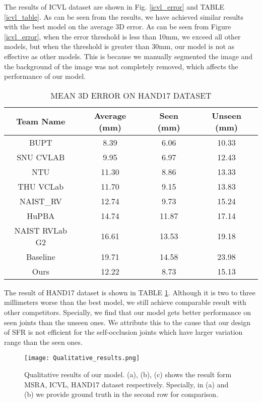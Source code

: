 \documentclass[journal]{IEEEtran}
\begin{document}
The results of ICVL dataset are shown in Fig\@. \ref{icvl_error} and TABLE \ref{icvl_table}.  
As can be seen from the results, we have achieved similar results with the best model\cite{chang2018v2v} on the average 3D error. 
As can be seen from Figure \ref{icvl_error}, when the error threshold is less than 10mm, we exceed all other models, 
but when the threshold is greater than 30mm, our model is not as effective as other models. 
This is because we manually segmented the image and the background of the image was not completely removed, 
which affects the performance of our model.

\begin{table}[!t]
\renewcommand{\arraystretch}{1.3}
  \caption{MEAN 3D ERROR ON HAND17 DATASET}
  \label{Hand17_table}
  \centering
    \begin{tabular}{c c c c}
    \toprule
    Team Name & Average (mm) & Seen (mm) & Unseen (mm)\\
    \hline
    BUPT & 8.39	& 6.06 & 10.33\\
    SNU CVLAB & 9.95 & 6.97 & 12.43\\
    NTU & 11.30 & 8.86 & 13.33\\
    THU VCLab & 11.70 & 9.15 & 13.83\\
    NAIST\_RV & 12.74 & 9.73 & 15.24\\
    HuPBA & 14.74 & 11.87 & 17.14\\
    NAIST RVLab G2 & 16.61 & 13.53 & 19.18\\
    Baseline & 19.71 & 14.58 & 23.98\\
    \hline
    Ours & 12.22 & 8.73 & 15.13\\
    \bottomrule
    \end{tabular}
\end{table}

The result of HAND17 dataset is shown in TABLE \ref{Hand17_table}. 
Although it is two to three millimeters worse than the best model, we still achieve comparable result with other competitors. 
Specially, we find that our model gets better performance on seen joints than the unseen ones. 
We attribute this to the cause that our design of SFR is not efficient for the self-occlusion joints which have larger variation range than the seen ones. 

\begin{figure*}[!t]
  \centering
  \texttt{[image: Qualitative\_results.png]}
  \caption{
    Qualitative results of our model. (a), (b), (c) shows the result form MSRA, ICVL, HAND17 dataset respectively. 
    Specially, in (a) and (b) we provide ground truth in the second row for comparison.
  }
  \label{qualitative_result}
\end{figure*}
\end{document}

